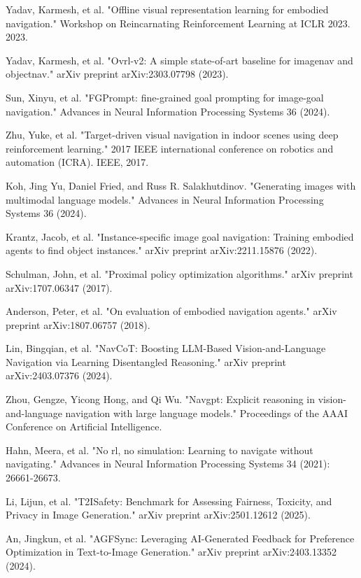 \begin{thebibliography}{99}
 Yadav, Karmesh, et al. "Offline visual representation learning for embodied navigation." Workshop on Reincarnating Reinforcement Learning at ICLR 2023. 2023.

 Yadav, Karmesh, et al. "Ovrl-v2: A simple state-of-art baseline for imagenav and objectnav." arXiv preprint arXiv:2303.07798 (2023).

 Sun, Xinyu, et al. "FGPrompt: fine-grained goal prompting for image-goal navigation." Advances in Neural Information Processing Systems 36 (2024).

 Zhu, Yuke, et al. "Target-driven visual navigation in indoor scenes using deep reinforcement learning." 2017 IEEE international conference on robotics and automation (ICRA). IEEE, 2017.

 Koh, Jing Yu, Daniel Fried, and Russ R. Salakhutdinov. "Generating images with multimodal language models." Advances in Neural Information Processing Systems 36 (2024).

 Krantz, Jacob, et al. "Instance-specific image goal navigation: Training embodied agents to find object instances." arXiv preprint arXiv:2211.15876 (2022).

 Schulman, John, et al. "Proximal policy optimization algorithms." arXiv preprint arXiv:1707.06347 (2017).

 Anderson, Peter, et al. "On evaluation of embodied navigation agents." arXiv preprint arXiv:1807.06757 (2018).

 Lin, Bingqian, et al. "NavCoT: Boosting LLM-Based Vision-and-Language Navigation via Learning Disentangled Reasoning." arXiv preprint arXiv:2403.07376 (2024).

 Zhou, Gengze, Yicong Hong, and Qi Wu. "Navgpt: Explicit reasoning in vision-and-language navigation with large language models." Proceedings of the AAAI Conference on Artificial Intelligence.

 Hahn, Meera, et al. "No rl, no simulation: Learning to navigate without navigating." Advances in Neural Information Processing Systems 34 (2021): 26661-26673.

 Li, Lijun, et al. "T2ISafety: Benchmark for Assessing Fairness, Toxicity, and Privacy in Image Generation." arXiv preprint arXiv:2501.12612 (2025).

 An, Jingkun, et al. "AGFSync: Leveraging AI-Generated Feedback for Preference Optimization in Text-to-Image Generation." arXiv preprint arXiv:2403.13352 (2024).


\end{thebibliography}
